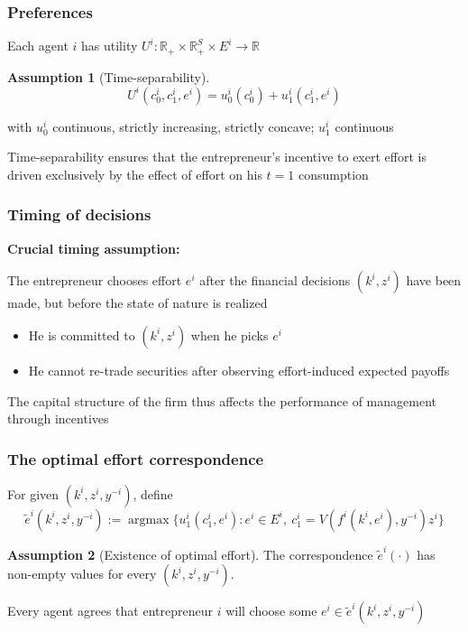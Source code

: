 \documentclass[blue]{beamer}
\def\R{\mathbb{R}}
\DeclareMathOperator\argmax{argmax}
\theoremstyle{definition}
\newtheorem*{assumption}{Assumption}
\theoremstyle{example}
\begin{document}
\begin{frame}\frametitle{Preferences}
Each agent $i$ has utility $U^i : \R_+ \times \R_+^S \times E^i \to \R$
\bigskip

\begin{assumption}[Time-separability]
\begin{equation*}
U^i(c^i_0, c^i_1, e^i) = u^i_0(c^i_0) + u^i_1(c^i_1, e^i)
\end{equation*}
\end{assumption}
\bigskip

with $u^i_0$ continuous, strictly increasing, strictly concave; $u^i_1$ continuous
\bigskip

Time-separability ensures that the entrepreneur's incentive to exert effort is driven exclusively by the effect of effort on his $t=1$ consumption
\end{frame}

\begin{frame}\frametitle{Timing of decisions}
\textbf{Crucial timing assumption:}
\bigskip

The entrepreneur chooses effort $e^i$ \alert{after} the financial decisions $(k^i, z^i)$ have been made, but \alert{before} the state of nature is realized
\bigskip

\begin{itemize}
\item He is committed to $(k^i, z^i)$ when he picks $e^i$
\item He cannot re-trade securities after observing effort-induced expected payoffs
\end{itemize}
\bigskip

The capital structure of the firm thus affects the performance of management through incentives
\end{frame}

\begin{frame}\frametitle{The optimal effort correspondence}
For given $(k^i, z^i, y^{-i})$, define
\begin{equation*}
\widetilde{e}^i(k^i, z^i, y^{-i}) := \argmax \bigl\{ u^i_1(c^i_1, e^i) \colon e^i \in E^i,\ c^i_1 = V(f^i(k^i, e^i), y^{-i}) z^i \bigr\}
\end{equation*}

\begin{assumption}[Existence of optimal effort]
The correspondence $\widetilde{e}^i(\cdot)$ has non-empty values for every $(k^i, z^i, y^{-i})$.
\end{assumption}
\bigskip

Every agent agrees that entrepreneur $i$ will choose some $e^i \in \widetilde{e}^i(k^i, z^i, y^{-i})$
\end{frame}
\end{document}
